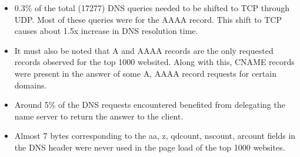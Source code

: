 \documentclass{article}
\begin{document}
\begin{itemize}
    \item 0.3\% of the total (17277) DNS queries needed to be shifted to TCP through UDP. Most of these queries were for the AAAA record. This shift to TCP causes about 1.5x increase in DNS resolution time.
    \item It must also be noted that A and AAAA records are the only requested records observed for the top 1000 websited. Along with this, CNAME records were present in the answer of some A, AAAA record requests for certain domains.
    \item Around 5\% of the DNS requests encountered benefited from delegating the name server to return the answer to the client.
    \item Almost 7 bytes corresponding to the aa, z, qdcount, nscount, arcount fields in the DNS header were never used in the page load of the top 1000 websites.
\end{itemize}




\end{document}
